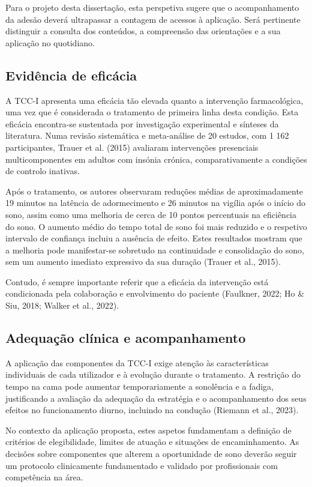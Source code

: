 Para o projeto desta dissertação, esta perspetiva sugere que o acompanhamento da adesão deverá ultrapassar a contagem de acessos à aplicação. Será pertinente distinguir a consulta dos conteúdos, a compreensão das orientações e a sua aplicação no quotidiano.


\subsection{Evidência de eficácia}

A TCC-I apresenta uma eficácia tão elevada quanto a intervenção farmacológica, uma vez que é considerada o tratamento de primeira linha desta condição. Esta eficácia encontra-se sustentada por investigação experimental e sínteses da literatura. Numa revisão sistemática e meta-análise de 20 estudos, com 1 162 participantes, Trauer et al. (2015) avaliaram intervenções presenciais multicomponentes em adultos com insónia crónica, comparativamente a condições de controlo inativas.

Após o tratamento, os autores observaram reduções médias de aproximadamente 19 minutos na latência de adormecimento e 26 minutos na vigília após o início do sono, assim como uma melhoria de cerca de 10 pontos percentuais na eficiência do sono. O aumento médio do tempo total de sono foi mais reduzido e o respetivo intervalo de confiança incluiu a ausência de efeito. Estes resultados mostram que a melhoria pode manifestar-se sobretudo na continuidade e consolidação do sono, sem um aumento imediato expressivo da sua duração (Trauer et al., 2015).

Contudo, é sempre importante referir que a eficácia da intervenção está condicionada pela colaboração e envolvimento do paciente (Faulkner, 2022; Ho \& Siu, 2018; Walker et al., 2022).


\subsection{Adequação clínica e acompanhamento}

A aplicação das componentes da TCC-I exige atenção às características individuais de cada utilizador e à evolução durante o tratamento. A restrição do tempo na cama pode aumentar temporariamente a sonolência e a fadiga, justificando a avaliação da adequação da estratégia e o acompanhamento dos seus efeitos no funcionamento diurno, incluindo na condução (Riemann et al., 2023).

No contexto da aplicação proposta, estes aspetos fundamentam a definição de critérios de elegibilidade, limites de atuação e situações de encaminhamento. As decisões sobre componentes que alterem a oportunidade de sono deverão seguir um protocolo clinicamente fundamentado e validado por profissionais com competência na área.

